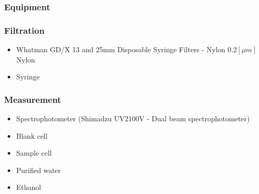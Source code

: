 \documentclass[]{spie}  %
\begin{document}
\subsubsection{Equipment}
\subsubsection*{Filtration}
\begin{itemize}
  \item Whatman GD/X 13 and 25mm Disposable Syringe Filters - Nylon $0.2[\mu m]$ Nylon
  \item {\color{red}Syringe}
\end{itemize}
\subsubsection*{Measurement}
\begin{itemize}
  \item Spectrophotometer (Shimadzu UV2100V - Dual beam spectrophotometer)
  \item Blank cell
  \item Sample cell
  \item Purified water
  \item Ethanol
\end{itemize}
\end{document}
